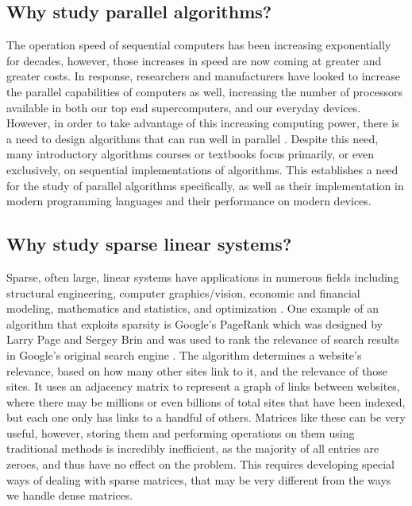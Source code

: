 \documentclass[pageno]{jpaper}
\begin{document}
\begin{doublespacing}
\subsection{Why study parallel algorithms?}
The operation speed of sequential computers has been increasing exponentially for decades, however, those increases in speed are now coming at greater and greater costs. In response, researchers and manufacturers have looked to increase the parallel capabilities of computers as well, increasing the number of processors available in both our top end supercomputers, and our everyday devices. However, in order to take advantage of this increasing computing power, there is a need to design algorithms that can run well in parallel \cite{blelloch-maggs}. Despite this need, many introductory algorithms courses or textbooks focus primarily, or even exclusively, on sequential implementations of algorithms. This establishes a need for the study of parallel algorithms specifically, as well as their implementation in modern programming languages and their performance on modern devices.

\subsection{Why study sparse linear systems?}
Sparse, often large, linear systems have applications in numerous fields including structural engineering, computer graphics/vision, economic and financial modeling, mathematics and statistics, and optimization \cite{davis-sparse-matrix}. One example of an algorithm that exploits sparsity is Google's PageRank which was designed by Larry Page and Sergey Brin and was used to rank the relevance of search results in Google's original search engine \cite{brin-pagerank}. The algorithm determines a website's relevance, based on how many other sites link to it, and the relevance of those sites. It uses an adjacency matrix to represent a graph of links between websites, where there may be millions or even billions of total sites that have been indexed, but each one only has links to a handful of others. Matrices like these can be very useful, however, storing them and performing operations on them using traditional methods is incredibly inefficient, as the majority of all entries are zeroes, and thus have no effect on the problem. This requires developing special ways of dealing with sparse matrices, that may be very different from the ways we handle dense matrices.


\end{doublespacing}
\end{document}
